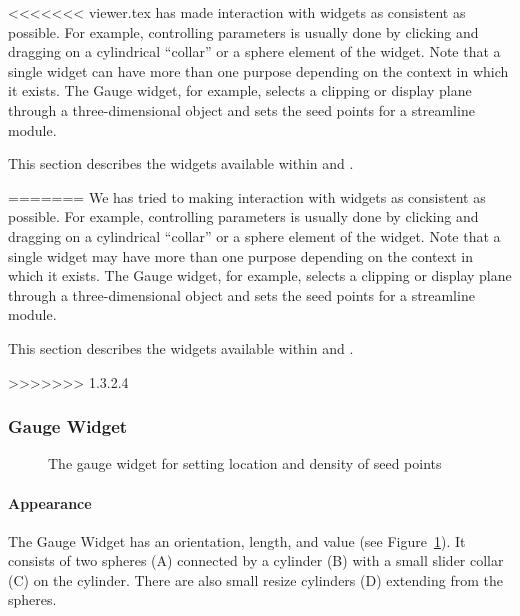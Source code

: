 <<<<<<< viewer.tex
\sci{} has made interaction with widgets as consistent as
possible. For example, controlling parameters is usually done by
clicking and dragging on a cylindrical ``collar'' or a sphere element
of the widget. Note that a single widget can have more than one
purpose depending on the context in which it exists. The Gauge widget,
for example, selects a clipping or display plane through a
three-dimensional object and sets the seed points for a streamline
module.

This section describes the widgets available within \SR{} and \BIOPSE{}.
 
=======
We has tried to making interaction with widgets as consistent as
possible. For example, controlling parameters is usually done by
clicking and dragging on a cylindrical ``collar'' or a sphere element
of the widget. Note that a single widget may have more than one
purpose depending on the context in which it exists. The Gauge widget,
for example, selects a clipping or display plane through a
three-dimensional object and sets the seed points for a streamline
module.

This section describes the widgets available within \SR{} and \BIOPSE{}.
 
>>>>>>> 1.3.2.4

\subsubsection{Gauge Widget}
\label{sec:view-gaugewidget} 

\begin{figure}[htb]
  \begin{makeimage}
  \end{makeimage}
  \gaugewidget
  \caption{\label{fig:gaugewidget} The gauge widget for setting location and
    density of seed points}
\end{figure}

\paragraph{Appearance} The Gauge
Widget has an orientation, length, and value (see Figure~\ref{fig:gaugewidget}). It consists of two spheres (A) connected by a cylinder (B) with a
small slider collar (C) on the cylinder.  There are also small resize
cylinders (D) extending from the spheres.

